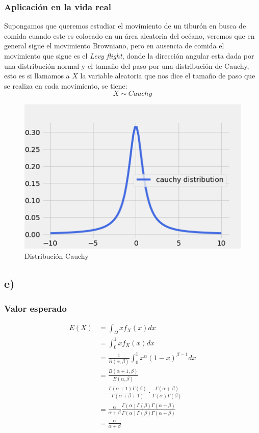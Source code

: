 \documentclass{article}
\begin{document}
\begin{tcolorbox}[breakable]
    \subsubsection*{Aplicación en la vida real}
    Supongamos que queremos estudiar el movimiento de un tiburón en busca de comida
    cuando este es colocado en un área aleatoria del océano, veremos que en general sigue el 
    movimiento Browniano, pero en ausencia de comida el movimiento que sigue es el \textit{Levy flight}, 
    donde la dirección angular esta dada por una distribución normal y el tamaño del paso por una distribución de Cauchy,
    esto es si llamamos a $X$ la variable aleatoria que nos dice el tamaño de paso que se realiza en cada movimiento, se tiene:
    \[X \sim Cauchy \]
    \begin{figure}[H]
        \centering
        \includegraphics[scale=0.7]{images/p7_cauchy.png}
        \caption{Distribución Cauchy}
    \end{figure}
    \subsection*{e)}
    \subsubsection*{Valor esperado}
    \begin{align*}
        E(X)
        &= \int_\Omega xf_X(x)dx \\
        &= \int_{0}^1 xf_X(x)dx \\
        &= \frac{1}{B(\alpha,\beta)} \int_{0}^1 x^\alpha(1-x)^{\beta-1}dx \\
        &= \frac{B(\alpha+1,\beta)}{B(\alpha,\beta)} \\
        &= \frac{\Gamma(\alpha+1)\Gamma(\beta)}{\Gamma(\alpha+\beta+1)} \cdot \frac{\Gamma(\alpha + \beta)}{\Gamma(\alpha)\Gamma(\beta)} \\
        &= \frac{\alpha}{\alpha + \beta} \frac{\Gamma(\alpha) \Gamma(\beta) \Gamma(\alpha + \beta)}{\Gamma(\alpha) \Gamma(\beta) \Gamma(\alpha + \beta)} \\
        &= \frac{\alpha}{\alpha + \beta} \\
    \end{align*}

\end{tcolorbox}
\end{document}
